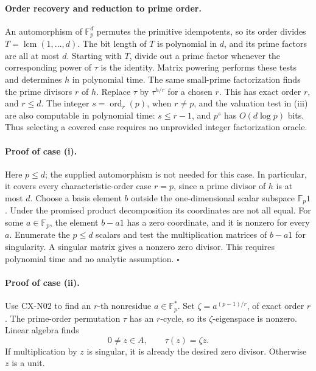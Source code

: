 \documentclass[11pt,a4paper]{article}
\begin{document}
\paragraph{Order recovery and reduction to prime order.}
An automorphism of \(\mathbb F_p^d\) permutes the primitive
idempotents, so its order divides
\(T=\operatorname{lcm}(1,\ldots,d)\).
The bit length of \(T\) is polynomial in \(d\), and its prime factors
are all at most \(d\).
Starting with \(T\), divide out a prime factor whenever the
corresponding power of \(\tau\) is the identity.
Matrix powering performs these tests and determines \(h\) in
polynomial time.
The same small-prime factorization finds the prime divisors \(r\)
of \(h\).
Replace \(\tau\) by \(\tau^{h/r}\) for a chosen \(r\).
This has exact order \(r\), and \(r\leq d\).
The integer \(s=\operatorname{ord}_r(p)\), when \(r\ne p\), and
the valuation test in (iii) are also computable in polynomial
time: \(s\leq r-1\), and \(p^s\) has \(O(d\log p)\) bits.
Thus selecting a covered case requires no unprovided integer
factorization oracle.

\paragraph{Proof of case (i).}
Here \(p\leq d\); the supplied automorphism is not needed for
this case. In particular, it covers every characteristic-order
case \(r=p\), since a prime divisor of \(h\) is at most \(d\).
Choose a basis element \(b\) outside the one-dimensional scalar
subspace \(\mathbb F_p1\).
Under the promised product decomposition its coordinates are not
all equal.
For some \(a\in\mathbb F_p\), the element \(b-a1\) has a zero
coordinate, and it is nonzero for every \(a\).
Enumerate the \(p\leq d\) scalars and test the multiplication
matrices of \(b-a1\) for singularity.
A singular matrix gives a nonzero zero divisor.
This requires polynomial time and no analytic assumption.
\hfill\(\square\)

\paragraph{Proof of case (ii).}
Use CX-N02 to find an \(r\)-th nonresidue \(a\in\mathbb F_p^*\).
Set \(\zeta=a^{(p-1)/r}\), of exact order \(r\).
The prime-order permutation \(\tau\) has an \(r\)-cycle, so its
\(\zeta\)-eigenspace is nonzero.
Linear algebra finds
\[
 0\ne z\in A,\qquad \tau(z)=\zeta z.
\]
If multiplication by \(z\) is singular, it is already the desired
zero divisor. Otherwise \(z\) is a unit.
\end{document}
